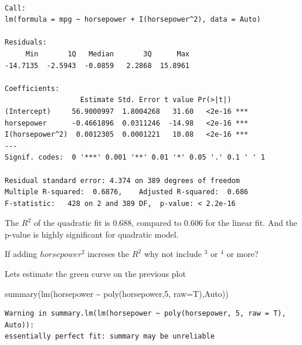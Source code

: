 \documentclass[
  letterpaper,
  DIV=11,
  numbers=noendperiod]{scrreprt}
\newenvironment{Shaded}{\begin{snugshade}}{\end{snugshade}}
\newcommand{\AttributeTok}[1]{\textcolor[rgb]{0.65,0.35,0.00}{#1}}
\newcommand{\DecValTok}[1]{\textcolor[rgb]{0.47,0.16,0.63}{#1}}
\newcommand{\FunctionTok}[1]{\textcolor[rgb]{0.02,0.16,0.49}{#1}}
\newcommand{\NormalTok}[1]{\textcolor[rgb]{0.33,0.33,0.33}{#1}}
\newcommand{\SpecialCharTok}[1]{\textcolor[rgb]{0.00,0.46,0.62}{#1}}
\begin{document}
\begin{verbatim}

Call:
lm(formula = mpg ~ horsepower + I(horsepower^2), data = Auto)

Residuals:
     Min       1Q   Median       3Q      Max 
-14.7135  -2.5943  -0.0859   2.2868  15.8961 

Coefficients:
                  Estimate Std. Error t value Pr(>|t|)    
(Intercept)     56.9000997  1.8004268   31.60   <2e-16 ***
horsepower      -0.4661896  0.0311246  -14.98   <2e-16 ***
I(horsepower^2)  0.0012305  0.0001221   10.08   <2e-16 ***
---
Signif. codes:  0 '***' 0.001 '**' 0.01 '*' 0.05 '.' 0.1 ' ' 1

Residual standard error: 4.374 on 389 degrees of freedom
Multiple R-squared:  0.6876,    Adjusted R-squared:  0.686 
F-statistic:   428 on 2 and 389 DF,  p-value: < 2.2e-16
\end{verbatim}

The \(R^2\) of the quadratic fit is 0.688, compared to 0.606 for the
linear fit. And the p-value is highly significant for quadratic model.

If adding \(horsepower^2\) increses the \(R^2\) why not include \(^3\)
or \(^4\) or more?

Lets estimate the green curve on the previous plot

\begin{Shaded}
\begin{Highlighting}[]
\FunctionTok{summary}\NormalTok{(}\FunctionTok{lm}\NormalTok{(horsepower }\SpecialCharTok{\textasciitilde{}} \FunctionTok{poly}\NormalTok{(horsepower,}\DecValTok{5}\NormalTok{, }\AttributeTok{raw=}\NormalTok{T),Auto))}
\end{Highlighting}
\end{Shaded}

\begin{verbatim}
Warning in summary.lm(lm(horsepower ~ poly(horsepower, 5, raw = T), Auto)):
essentially perfect fit: summary may be unreliable
\end{verbatim}
\end{document}

